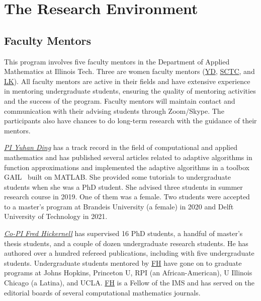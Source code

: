 \documentclass[11pt]{NSFamsart}
\newcommand{\FH}{\hyperlink{FHlink}{FH}\xspace}
\newcommand{\SCTC}{\hyperlink{SCTClink}{SCTC}\xspace}
\newcommand{\YD}{\hyperlink{YDlink}{YD}\xspace}
\newcommand{\LK}{\hyperlink{LKlink}{LK}\xspace}
\begin{document}













\section{The Research Environment}

\subsection{Faculty Mentors}
This program involves five faculty
mentors in the Department of Applied Mathematics at
Illinois Tech. Three are women faculty mentors (\YD, \SCTC, and \LK). All faculty mentors are
active in their fields and have extensive experience in mentoring undergraduate students, ensuring the quality of mentoring activities and the success of the program. 
Faculty mentors will maintain contact and communication with their advising students through Zoom/Skype. The participants also have chances to do long-term research with the guidance of their mentors.

\noindent \underline{\textit{PI Yuhan Ding}}  has a track record in the field of computational and applied
mathematics and has published several articles related to adaptive algorithms in function approximations and implemented the adaptive algorithms in a toolbox GAIL~\cite{
ChoEtal21a} built on MATLAB. She provided some tutorials to undergraduate students when she was a PhD student. She advised three students in summer research course in 2019. One of them was a female. Two students were accepted to a master's program at Brandeis University (a female) in 2020 and Delft University of Technology in 2021.

\noindent \underline{\textit{Co-PI Fred Hickernell}} has supervised 16 PhD students, a handful of master's thesis students, and a couple of dozen undergraduate research students.  He has authored over a hundred refereed publications, including \cite{ChoEtal22a,HicEtal14b,LiHic03a,SonRidFasHic10a} with five undergraduate students.  Undergraduate students mentored by \FH have gone on to graduate programs at Johns Hopkins, Princeton U, RPI (an African-American), U Illinois Chicago (a Latina), and UCLA. \FH is a Fellow of the IMS and has served on the editorial boards of several computational mathematics journals. 
\end{document}

